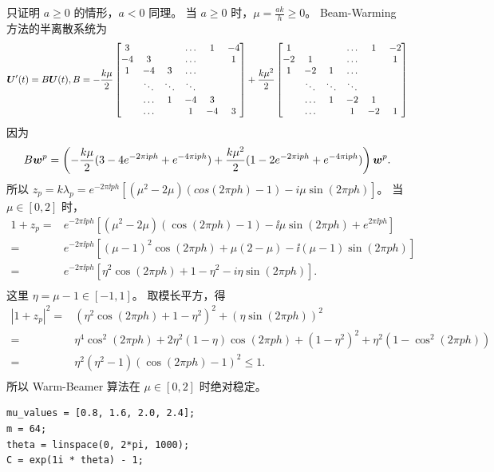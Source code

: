 \documentclass[lang=cn,a4paper,newtx,bibend=bibtex]{elegantpaper}
\begin{document}
\begin{solution}
  只证明 $a\geq 0$ 的情形，$a<0$ 同理。
  当 $a\geq 0$ 时，$\mu = \frac{ak}{h}\geq 0$。
  Beam-Warming 方法的半离散系统为
  \begin{equation*}
    \bm{U}'(t) = B\bm{U}(t),
    B = -\frac{k\mu}2\begin{bmatrix} 
      3 & & & \dots & 1 & -4 \\
      -4 & 3 & & \dots & & 1 \\
      1 & -4 & 3 & \dots & & \\
      & \ddots & \ddots & \ddots & & \\
      & \dots & 1 & -4 & 3 & \\
      & \dots & & 1 & -4 & 3 \\
     \end{bmatrix}
    + \frac{k\mu^2}2\begin{bmatrix} 
      1 & & & \dots & 1 & -2 \\
      -2 & 1 & & \dots & & 1 \\
      1 & -2 & 1 & \dots & & \\
      & \ddots & \ddots & \ddots & & \\
      & \dots & 1 & -2 & 1 & \\
      & \dots & & 1 & -2 & 1 \\
     \end{bmatrix}
  \end{equation*}
  因为
  \begin{equation*}
    B\bm{w}^p = \left(-\dfrac{k\mu}{2}(3-4e^{-2\pi\mathrm{i} ph}+e^{-4\pi\mathrm{i} ph}) + \dfrac{k\mu^2}{2}(1-2e^{-2\pi\mathrm{i} ph}+e^{-4\pi\mathrm{i} ph})\right)\bm{w}^p.
  \end{equation*}
  所以 $z_p = k\lambda_p = e^{-2\pi\ii ph}\left[(\mu^2-2\mu)(cos(2\pi ph)-1) - i\mu\sin(2\pi ph)\right]$。
  当 $\mu\in [0,2]$ 时，
  \begin{equation*}
    \begin{aligned}
      1+z_p = & e^{-2\pi\ii ph}[(\mu^2-2\mu)(\cos(2\pi ph)-1) - \ii\mu\sin(2\pi ph) + e^{2\pi\ii ph}] & \\
      = & e^{-2\pi\ii ph}[(\mu-1)^2\cos(2\pi ph) + \mu(2-\mu) - \ii(\mu-1)\sin(2\pi ph)] & \\
      = & e^{-2\pi\ii ph}[\eta^2\cos(2\pi ph) + 1-\eta^2 - i\eta\sin(2\pi ph)]. & \\
    \end{aligned}
  \end{equation*}
  这里 $\eta = \mu-1\in [-1,1]$。
  取模长平方，得
  \begin{equation*}
    \begin{aligned}
      |1+z_p|^2 = & (\eta^2\cos(2\pi ph) + 1-\eta^2)^2 + (\eta\sin(2\pi ph))^2 & \\
      = & \eta^4\cos^2(2\pi ph) + 2\eta^2(1-\eta)\cos(2\pi ph) + (1-\eta^2)^2 + \eta^2(1-\cos^2(2\pi ph)) & \\
      = & \eta^2(\eta^2-1)(\cos(2\pi ph)-1)^2 \leq 1. & \\
    \end{aligned}
  \end{equation*}
  所以 Warm-Beamer 算法在 $\mu\in [0,2]$ 时绝对稳定。
  \begin{lstlisting}
mu_values = [0.8, 1.6, 2.0, 2.4];
m = 64;
theta = linspace(0, 2*pi, 1000);
C = exp(1i * theta) - 1;


\end{lstlisting}
\end{solution}
\end{document}
